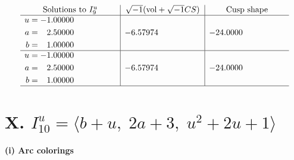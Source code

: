 \documentclass[1p]{elsarticle_modified}
\theoremstyle{definition}
\newcommand{\I}{\sqrt{-1}}
\begin{document}
$$\begin{array}{c|c|c}  
\text{Solutions to }I^u_{9}& \I (\text{vol} + \sqrt{-1}CS) & \text{Cusp shape}\\
 \hline 
\begin{aligned}
u &= -1.00000\phantom{ +0.000000I} \\
a &= \phantom{-}2.50000\phantom{ +0.000000I} \\
b &= \phantom{-}1.00000\phantom{ +0.000000I}\end{aligned}
 & -6.57974\phantom{ +0.000000I} & -24.0000\phantom{ +0.000000I} \\ \hline\begin{aligned}
u &= -1.00000\phantom{ +0.000000I} \\
a &= \phantom{-}2.50000\phantom{ +0.000000I} \\
b &= \phantom{-}1.00000\phantom{ +0.000000I}\end{aligned}
 & -6.57974\phantom{ +0.000000I} & -24.0000\phantom{ +0.000000I}\\
 \hline 
 \end{array}$$\newpage\newpage\renewcommand{\arraystretch}{1}
\centering \section*{X. $I^u_{10}= \langle b+u,\;2 a+3,\;u^2+2 u+1 \rangle$}
\flushleft \textbf{(i) Arc colorings}\\
\end{document}
